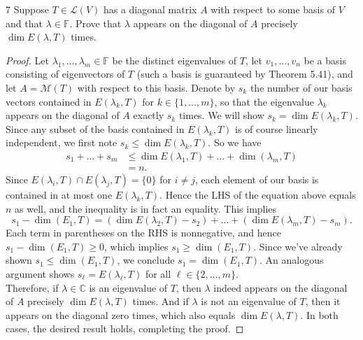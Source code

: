 \documentclass{extarticle}
\newenvironment{problem}[1]{\begin{prob*}{#1}{}}{\end{prob*}}
\newcommand{\C}{\mathbb{C}}
\newcommand{\F}{\mathbb{F}}
\newcommand{\mat}{\mathcal{M}}
\newcommand{\Hom}{\mathcal{L}}
\begin{document}
\begin{problem}{7}
Suppose $T\in\Hom(V)$ has a diagonal matrix $A$ with respect to some basis of $V$ and that $\lambda\in\F$.  Prove that $\lambda$ appears on the diagonal of $A$ precisely $\dim E(\lambda,T)$ times.
\end{problem}
\begin{proof}
Let $\lambda_1,\dots, \lambda_m\in\F$ be the distinct eigenvalues of $T$, let $v_1,\dots, v_n$ be a basis consisting of eigenvectors of $T$ (such a basis is guaranteed by Theorem 5.41), and let $A = \mat(T)$ with respect to this basis.  Denote by $s_k$ the number of our basis vectors contained in $E(\lambda_k, T)$ for $k\in\{1,\dots,m\}$, so that the eigenvalue $\lambda_k$ appears on the diagonal of $A$ exactly $s_k$ times.  We will show $s_k = \dim E(\lambda_k, T)$.\\
\indent Since any subset of the basis contained in $E(\lambda_k, T)$ is of course linearly independent, we first note $s_k\leq \dim E(\lambda_k, T)$.  So we have
\begin{align*}
s_1 + \dots + s_m &\leq \dim E(\lambda_1, T) + \dots + \dim(\lambda_m, T)\\
&= n.
\end{align*}
Since $E(\lambda_i, T)\cap E(\lambda_j, T) = \{0\}$ for $i\neq j$, each element of our basis is contained in at most one $E(\lambda_k, T)$.  Hence the LHS of the equation above equals $n$ as well, and the inequality is in fact an equality.  This implies
\begin{equation*}
s_1 -\dim(E_1, T) = (\dim E(\lambda_2, T) - s_2) + \dots + (\dim E(\lambda_m, T) - s_m).
\end{equation*}
Each term in parentheses on the RHS is nonnegative, and hence $s_1 - \dim(E_1, T) \geq 0$, which implies $s_1 \geq \dim(E_1, T)$.  Since we've already shown $s_1\leq \dim(E_1, T)$, we conclude $s_1 = \dim(E_1, T)$.  An analogous argument shows $s_\ell = E(\lambda_\ell, T)$ for all $\ell\in\{2,\dots,m\}$.\\
\indent Therefore, if $\lambda\in\C$ is an eigenvalue of $T$, then $\lambda$ indeed appears on the diagonal of $A$ precisely $\dim E(\lambda, T)$ times.  And if $\lambda$ is not an eigenvalue of $T$, then it appears on the diagonal zero times, which also equals $\dim E(\lambda, T)$.  In both cases, the desired result holds, completing the proof.
\end{proof}
\end{document}
